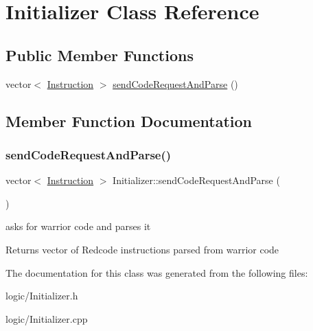\hypertarget{classInitializer}{}\section{Initializer Class Reference}
\label{classInitializer}
\subsection*{Public Member Functions}
\begin{DoxyCompactItemize}
\item 
vector$<$ \hyperlink{classInstruction}{Instruction} $>$ \hyperlink{classInitializer_a3bca75fbbca3beafebcc234b4749bdb5}{send\+Code\+Request\+And\+Parse} ()
\end{DoxyCompactItemize}


\subsection{Member Function Documentation}
\mbox{\label{classInitializer_a3bca75fbbca3beafebcc234b4749bdb5}} 
\subsubsection{\texorpdfstring{send\+Code\+Request\+And\+Parse()}{sendCodeRequestAndParse()}}
{\footnotesize\ttfamily vector$<$ \hyperlink{classInstruction}{Instruction} $>$ Initializer\+::send\+Code\+Request\+And\+Parse (\begin{DoxyParamCaption}{ }\end{DoxyParamCaption})}

asks for warrior code and parses it \begin{DoxyReturn}{Returns}
vector of Redcode instructions parsed from warrior code 
\end{DoxyReturn}


The documentation for this class was generated from the following files\+:\begin{DoxyCompactItemize}
\item 
logic/Initializer.\+h\item 
logic/Initializer.\+cpp\end{DoxyCompactItemize}
